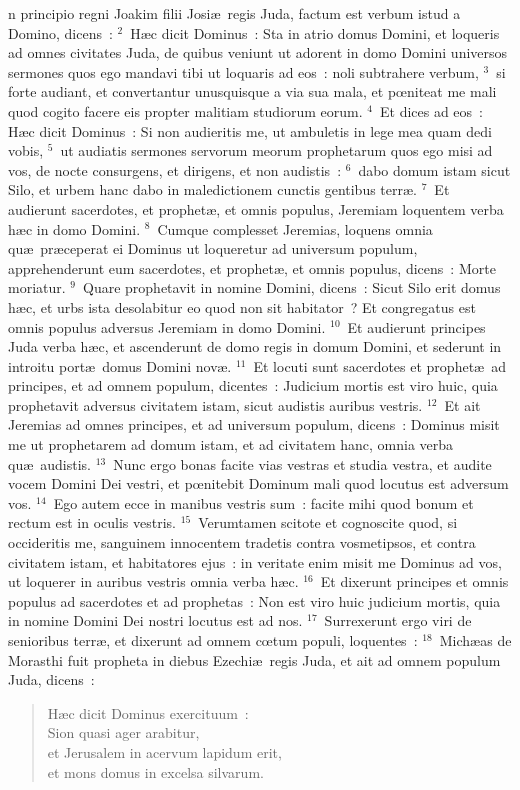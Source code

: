 \bchapter
{}n principio regni Joakim filii Josi\ae\ regis Juda, factum est verbum istud a Domino, dicens~:
${}^{2}$~H\ae c dicit Dominus~: Sta in atrio domus Domini, et loqueris ad omnes civitates Juda, de quibus veniunt ut adorent in domo Domini universos sermones quos ego mandavi tibi ut loquaris ad eos~: noli subtrahere verbum,
${}^{3}$~si forte audiant, et convertantur unusquisque a via sua mala, et pœniteat me mali quod cogito facere eis propter malitiam studiorum eorum.
${}^{4}$~Et dices ad eos~: H\ae c dicit Dominus~: Si non audieritis me, ut ambuletis in lege mea quam dedi vobis,
${}^{5}$~ut audiatis sermones servorum meorum prophetarum quos ego misi ad vos, de nocte consurgens, et dirigens, et non audistis~:
${}^{6}$~dabo domum istam sicut Silo, et urbem hanc dabo in maledictionem cunctis gentibus terr\ae .
${}^{7}$~Et audierunt sacerdotes, et prophet\ae , et omnis populus, Jeremiam loquentem verba h\ae c in domo Domini.
${}^{8}$~Cumque complesset Jeremias, loquens omnia qu\ae\ pr\ae ceperat ei Dominus ut loqueretur ad universum populum, apprehenderunt eum sacerdotes, et prophet\ae , et omnis populus, dicens~: Morte moriatur.
${}^{9}$~Quare prophetavit in nomine Domini, dicens~: Sicut Silo erit domus h\ae c, et urbs ista desolabitur eo quod non sit habitator~? Et congregatus est omnis populus adversus Jeremiam in domo Domini.
${}^{10}$~Et audierunt principes Juda verba h\ae c, et ascenderunt de domo regis in domum Domini, et sederunt in introitu port\ae\ domus Domini nov\ae .
${}^{11}$~Et locuti sunt sacerdotes et prophet\ae\ ad principes, et ad omnem populum, dicentes~: Judicium mortis est viro huic, quia prophetavit adversus civitatem istam, sicut audistis auribus vestris.
${}^{12}$~Et ait Jeremias ad omnes principes, et ad universum populum, dicens~: Dominus misit me ut prophetarem ad domum istam, et ad civitatem hanc, omnia verba qu\ae\ audistis.
${}^{13}$~Nunc ergo bonas facite vias vestras et studia vestra, et audite vocem Domini Dei vestri, et pœnitebit Dominum mali quod locutus est adversum vos.
${}^{14}$~Ego autem ecce in manibus vestris sum~: facite mihi quod bonum et rectum est in oculis vestris.
${}^{15}$~Verumtamen scitote et cognoscite quod, si occideritis me, sanguinem innocentem tradetis contra vosmetipsos, et contra civitatem istam, et habitatores ejus~: in veritate enim misit me Dominus ad vos, ut loquerer in auribus vestris omnia verba h\ae c.
${}^{16}$~Et dixerunt principes et omnis populus ad sacerdotes et ad prophetas~: Non est viro huic judicium mortis, quia in nomine Domini Dei nostri locutus est ad nos.
${}^{17}$~Surrexerunt ergo viri de senioribus terr\ae , et dixerunt ad omnem cœtum populi, loquentes~:
${}^{18}$~Mich\ae as de Morasthi fuit propheta in diebus Ezechi\ae\ regis Juda, et ait ad omnem populum Juda, dicens~: \begin{flushleft}\begin{verse}H\ae c dicit Dominus exercituum~:\\ Sion quasi ager arabitur,\\ et Jerusalem in acervum lapidum erit,\\ et mons domus in excelsa silvarum.\end{verse}\end{flushleft}


